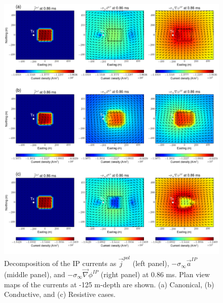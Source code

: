 \documentclass[a4paper, 11pt]{article}
\newcommand{\grad}{\vec \nabla}
\newcommand{\siginf}{\sigma_\infty}
\renewcommand {\j}  { {\vec j} }
\begin{document}
\begin{figure}[htb]
  \centering
  \includegraphics[width=1.\textwidth]{figures/IPcurrents_helmholtz_early.png}
  \caption{Decomposition of the IP currents as $\j^{pol}$ (left panel), $-\siginf\vec{a}^{IP}$ (middle panel), and $-\siginf\grad \phi^{IP}$ (right panel) at 0.86 ms. Plan view maps of the currents at -125 m-depth are shown. (a) Canonical, (b) Conductive, and (c) Resistive cases. }
  \label{F:IPcurrents_helmholtz_early}
\end{figure}
\end{document}

